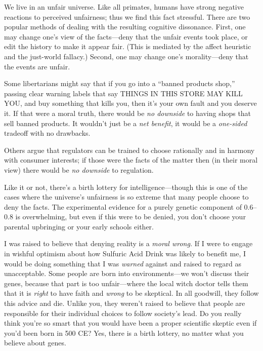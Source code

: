 {
 We live in an unfair universe. Like all primates, humans have
strong negative reactions to perceived unfairness; thus we find this
fact stressful. There are two popular methods of dealing with the
resulting cognitive dissonance. First, one may change
one's view of the facts---deny that the unfair events
took place, or edit the history to make it appear fair. (This is
mediated by the affect heuristic and the just-world fallacy.) Second,
one may change one's morality---deny that the events
are unfair.}

{
 Some libertarians might say that if you go into a
``banned products shop,'' passing
clear warning labels that say THINGS IN THIS STORE MAY KILL YOU, and
buy something that kills you, then it's your own fault
and you deserve it. If that were a moral truth, there would be
\textit{no downside} to having shops that sell banned products. It
wouldn't just be a \textit{net benefit}, it would be a
\textit{one-sided} tradeoff with no drawbacks.}

{
 Others argue that regulators can be trained to choose rationally
and in harmony with consumer interests; if those were the facts of the
matter then (in their moral view) there would be \textit{no downside}
to regulation.}

{
 Like it or not, there's a birth lottery for
intelligence---though this is one of the cases where the
universe's unfairness is so extreme that many people
choose to deny the facts. The experimental evidence for a purely
genetic component of 0.6--0.8 is overwhelming, but even if this were to
be denied, you don't choose your parental upbringing or
your early schools either.}

{
 I was raised to believe that denying reality is a \textit{moral
wrong.} If I were to engage in wishful optimism about how Sulfuric Acid
Drink was likely to benefit me, I would be doing something that I was
\textit{warned} against and raised to regard as unacceptable. Some
people are born into environments---we won't discuss
their genes, because that part is too unfair---where the local witch
doctor tells them that it is \textit{right} to have faith and
\textit{wrong} to be skeptical. In all goodwill, they follow this
advice and die. Unlike you, they weren't raised to
believe that people are responsible for their individual choices to
follow society's lead. Do you really think
you're so smart that you would have been a proper
scientific skeptic even if you'd been born in 500 CE?
Yes, there is a birth lottery, no matter what you believe about genes.}

